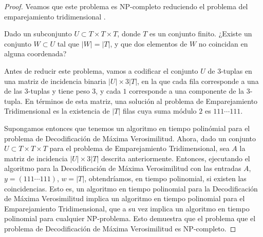 \begin{proof}
    Veamos que este problema es NP-completo reduciendo el problema del emparejamiento tridimensional \cite{Intractability_coding_problems}.

    \begin{problemth}
        Dado un subconjunto $U \subset T \times T \times T$, donde $T$ es un conjunto finito. ¿Existe un conjunto $W \subset U$ tal que $\vert W \vert = \vert T \vert$, y que dos elementos de $W$ no coincidan en alguna coordenada?
    \end{problemth}

    Antes de reducir este problema, vamos a codificar el conjunto $U$ de $3$-tuplas en una matriz de incidencia binaria $\vert U \vert \times 3 \vert T \vert$, en la que cada fila corresponde a una de las $3$-tuplas y tiene peso $3$, y cada $1$ corresponde a una componente de la $3$-tupla. En términos de esta matriz, una solución al problema de Emparejamiento Tridimensional es la existencia de $\vert T \vert$ filas cuya suma módulo $2$ es $111\cdots111$.

    Supongamos entonces que tenemos un algoritmo en tiempo polinómial para el problema de Decodificación de Máxima Verosimilitud. Ahora, dado un conjunto $U \subset T \times T \times T$ para el problema de Emparejamiento Tridimensional, sea $A$ la matriz de incidencia $\vert U \vert \times 3 \vert T \vert$ descrita anteriormente. Entonces, ejecutando el algoritmo para la Decodificación de Máxima Verosimilitud con las entradas $A$, $y = (111\cdots111)$, $w = \vert T \vert$, obtendríamos, en tiempo polinomial, si existen las coincidencias. Esto es, un algoritmo en tiempo polinomial para la Decodificación de Máxima Verosimilitud implica un algoritmo en tiempo polinomial para el Emparejamiento Tridimensional, que a su vez implica un algoritmo en tiempo polinomial para cualquier NP-problema. Esto demuestra que el problema que el problema de Decodificación de Máxima Verosimilitud es NP-completo.
\end{proof}

